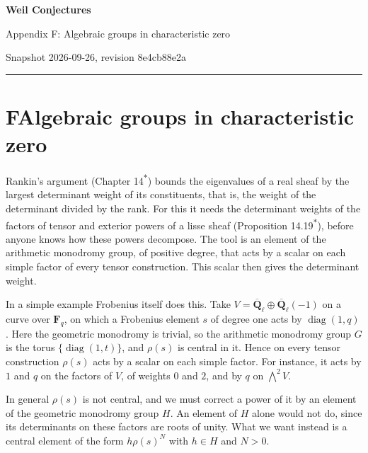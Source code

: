 \documentclass[11pt]{article}
\newcommand{\bpout}[1]{#1\textsuperscript{\hyperlink{bp-outside}{\ensuremath{\ast}}}}
\begin{document}
\pagestyle{plain}
\begin{center}
{\LARGE\bfseries Weil Conjectures\par}
\vspace{0.7em}
{\large Appendix F: Algebraic groups in characteristic zero\par}
\vspace{0.5em}
{\small\color{bpmuted}Snapshot 2026-09-26, revision 8e4cb88e2a\par}
\end{center}
\vspace{0.5em}
{\small\tableofcontents}
\bigskip\hrule\bigskip

\section*{\texorpdfstring{F\quad Algebraic groups in characteristic zero}{F Algebraic groups in characteristic zero}}
\label{bp1}%
\label{bp2}%
Rankin's argument (Chapter \bpout{14}) bounds the eigenvalues of a real sheaf by the largest determinant weight of its constituents, that is, the weight of the determinant divided by the rank. For this it needs the determinant weights of the factors of tensor and exterior powers of a lisse sheaf (Proposition \bpout{14.19}), before anyone knows how these powers decompose. The tool is an element of the arithmetic monodromy group, of positive degree, that acts by a scalar on each simple factor of every tensor construction. This scalar then gives the determinant weight.

In a simple example Frobenius itself does this. Take \(V=\overline{\mathbf Q}_\ell\oplus\overline{\mathbf Q}_\ell(-1)\) on a curve over \(\mathbf F_q\), on which a Frobenius element \(s\) of degree one acts by \(\operatorname{diag}(1,q)\). Here the geometric monodromy is trivial, so the arithmetic monodromy group \(G\) is the torus \(\{\operatorname{diag}(1,t)\}\), and \(\rho(s)\) is central in it. Hence on every tensor construction \(\rho(s)\) acts by a scalar on each simple factor. For instance, it acts by \(1\) and \(q\) on the factors of \(V\), of weights \(0\) and \(2\), and by \(q\) on \(\bigwedge^2V\).

In general \(\rho(s)\) is not central, and we must correct a power of it by an element of the geometric monodromy group \(H\). An element of \(H\) alone would not do, since its determinants on these factors are roots of unity. What we want instead is a central element of the form \(h\rho(s)^N\) with \(h\in H\) and \(N>0\).
\end{document}
